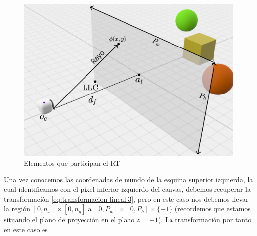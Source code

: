 \begin{figure} [ht]
    \centering
    \includegraphics[scale = 0.25]{img/C7/elementos-PP.png}
    \caption{Elementos que participan el RT}
    \label{fig:elementos}
\end{figure}

Una vez conocemos las coordenadas de mundo de la esquina superior izquierda, la cual identificamos con el píxel inferior izquierdo del canvas, debemos recuperar la transformación \ref{eq:transformacion-lineal-3}, pero en este caso nos debemos llevar la región $[0,n_x]\times[0,n_y]$ a $[0,P_w]\times[0,P_h]\times\{-1\}$ (recordemos que estamos situando el plano de proyección en el plano $z=-1$). La transformación por tanto en este caso es

